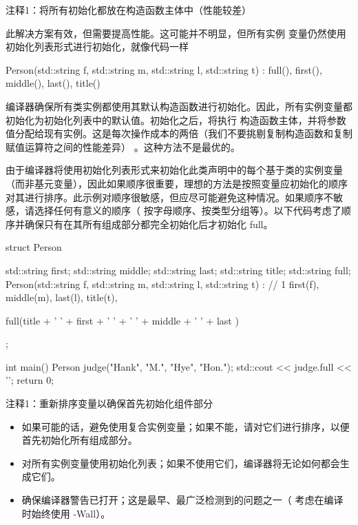 {\footnotesize
注释1：将所有初始化都放在构造函数主体中（性能较差）
}

此解决方案有效，但需要提高性能。这可能并不明显，但所有实例 变量仍然使用初始化列表形式进行初始化，就像代码一样

\begin{cpp}
Person(std::string f, std::string m, std::string l, std::string t) :
  full(), first(), middle(), last(), title() {}
\end{cpp}

编译器确保所有类实例都使用其默认构造函数进行初始化。因此，所有实例变量都初始化为初始化列表中的默认值。初始化之后，将执行 构造函数主体，并将参数值分配给现有实例。这是每次操作成本的两倍（我们不要挑剔复制构造函数和复制赋值运算符之间的性能差异） 。这种方法不是最优的。


由于编译器将使用初始化列表形式来初始化此类声明中的每个基于类的实例变量（而非基元变量），因此如果顺序很重要，理想的方法是按照变量应初始化的顺序对其进行排序。此示例对顺序很敏感，但应尽可能避免这种情况。如果顺序不敏感，请选择任何有意义的顺序（ 按字母顺序、按类型分组等）。以下代码考虑了顺序并确保只有在其所有组成部分都完全初始化后才初始化 full。


\begin{cpp}
struct Person {
  std::string first;
  std::string middle;
  std::string last;
  std::string title;
  std::string full;
  Person(std::string f, std::string m, std::string l,
         std::string t) : // 1
    first(f), middle(m), last(l), title(t),

  full(title + ' ' + first + ' ' + ' ' + middle + ' ' + last ) {}
};

int main() {
  Person judge("Hank", "M.", "Hye", "Hon.");
  std::cout << judge.full << '\n';
  return 0;
}
\end{cpp}

{\footnotesize
注释1：重新排序变量以确保首先初始化组件部分
}


\begin{itemize}
\item
如果可能的话，避免使用复合实例变量；如果不能，请对它们进行排序，以便首先初始化所有组成部分。

\item
对所有实例变量使用初始化列表；如果不使用它们，编译器将无论如何都会生成它们。

\item
确保编译器警告已打开；这是最早、最广泛检测到的问题之一（ 考虑在编译时始终使用 -Wall）。
\end{itemize}













